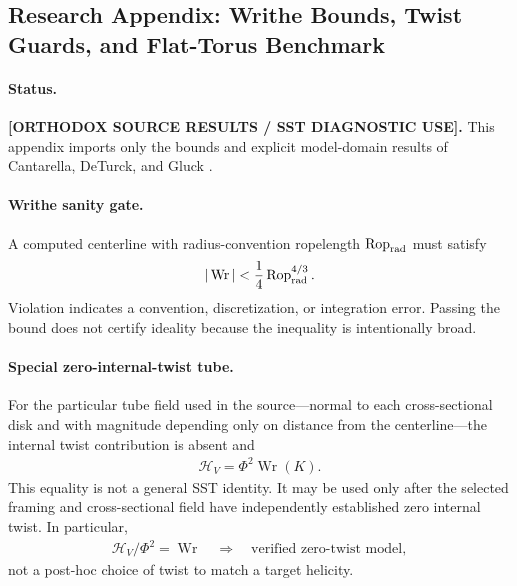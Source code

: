 \subsection{Research Appendix: Writhe Bounds, Twist Guards, and Flat-Torus Benchmark}
    \label{subsec:rt_upper_bounds_writhe_helicity}

    \paragraph{Status.}
    \textbf{[ORTHODOX SOURCE RESULTS / SST DIAGNOSTIC USE].}
    This appendix imports only the bounds and explicit model-domain results of
    Cantarella, DeTurck, and Gluck
    \cite{CantarellaDeTurckGluck2001UpperBounds}.

    \paragraph{Writhe sanity gate.}
    A computed centerline with radius-convention ropelength
    \(\operatorname{Rop}_{\rm rad}\) must satisfy
    \begin{align}
        |\operatorname{Wr}|
        <
        \frac14\operatorname{Rop}_{\rm rad}^{4/3}.
        \label{eq:rt_writhe_sanity_gate}
    \end{align}
    Violation indicates a convention, discretization, or integration error.  Passing
    the bound does not certify ideality because the inequality is intentionally broad.

    \paragraph{Special zero-internal-twist tube.}
    For the particular tube field used in the source---normal to each cross-sectional
    disk and with magnitude depending only on distance from the centerline---the
    internal twist contribution is absent and
    \begin{align}
        \mathscr H_V
        =
        \Phi^2\operatorname{Wr}(K).
        \label{eq:rt_special_zero_twist_helicity}
    \end{align}
    This equality is not a general SST identity.  It may be used only after the
    selected framing and cross-sectional field have independently established zero
    internal twist.  In particular,
    \begin{align}
        \mathscr H_V/\Phi^2
        =
        \operatorname{Wr}
        \quad\Longrightarrow\quad
        \text{verified zero-twist model},
        \label{eq:rt_zero_twist_implication_guard}
    \end{align}
    not a post-hoc choice of twist to match a target helicity.

